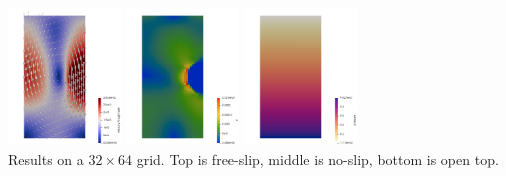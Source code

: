 \begin{center}
\includegraphics[width=3cm]{python_codes/fieldstone_02/results/vel2}
\includegraphics[width=3cm]{python_codes/fieldstone_02/results/sr2}
\includegraphics[width=3cm]{python_codes/fieldstone_02/results/p2}\\
{\captionfont Results on a $32\times 64$ grid. Top is free-slip, 
middle is no-slip, bottom is open top.}
\end{center}


